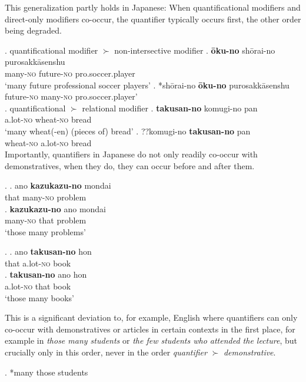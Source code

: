 \documentclass [output=book,colorlinks,citecolor=brown]{langscibook}
\begin{document}
This generalization partly holds in Japanese: When quantificational modifiers and direct-only modifiers co-occur, the quantifier typically occurs first, the other order being degraded.

\ex. quantificational modifier $\succ$ non-intersective modifier
\ag. \textbf{ōku-no} shōrai-no purosakkāsenshu\\
many-\textsc{no} future-\textsc{no} pro.soccer.player\\
`many future professional soccer players’
\bg. *shōrai-no \textbf{ōku-no} purosakkāsenshu\\
future-\textsc{no} many-\textsc{no} pro.soccer.player'\\

\ex. quantificational $\succ$ relational modifier
\ag. \textbf{takusan-no} komugi-no pan\\
a.lot-\textsc{no} wheat-\textsc{no} bread\\
`many wheat(-en) (pieces of) bread’ \label{takusankomugi}
\bg. ??komugi-no \textbf{takusan-no} pan\\
wheat-\textsc{no} a.lot-\textsc{no} bread\\

Importantly, quantifiers in Japanese do not only readily co-occur with demonstratives, when they do, they can occur before and after them. %

\ex. \ag. ano \textbf{kazukazu-no} mondai\\
that many-\textsc{no} problem\\
\bg. \textbf{kazukazu-no} ano mondai\\
many-\textsc{no} that problem\\
`those many problems’

\ex. \ag. ano \textbf{takusan-no} hon\\
that a.lot-\textsc{no} book\\
\bg. \textbf{takusan-no} ano hon\\
a.lot-\textsc{no} that book\\
`those many books’

This is a significant deviation to, for example, English where quantifiers can only co-occur with demonstratives or articles in certain contexts in the first place, for example in \textit{those many students} or \textit{the few students who attended the lecture}, but crucially only in this order, never in the order \textit{quantifier} $\succ$ \textit{demonstrative}.

\ex. *many those students
\end{document}
